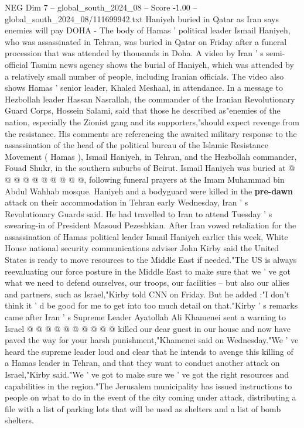\begin{textsample}{NEG Dim 7 – global\_south\_2024\_08 – Score -1.00 – global\_south\_2024\_08/111699942.txt}  \label{ex:f7_neg_279}
Haniyeh buried in Qatar as Iran says enemies will pay DOHA - The body of Hamas ' political leader Ismail Haniyeh, who was assassinated in Tehran, was buried in Qatar on Friday after a funeral procession that was attended by thousands in Doha.
A video by Iran ' s semi-official Tasnim news agency shows the burial of Haniyeh, which was attended by a relatively small number of people, including Iranian officials.
The video also shows Hamas ' senior leader, Khaled Meshaal, in attendance.
In a message to Hezbollah leader Hassan Nasrallah, the commander of the Iranian Revolutionary Guard Corps, Hossein Salami, said that those he described as"enemies of the nation, especially the Zionist gang and its supporters,"should expect revenge from the resistance.
His comments are referencing the awaited military response to the assassination of the head of the political bureau of the Islamic Resistance Movement ( Hamas ), Ismail Haniyeh, in Tehran, and the Hezbollah commander, Fouad Shukr, in the southern suburbs of Beirut.
Ismail Haniyeh was buried at @ @ @ @ @ @ @ @ @ @, following funeral prayers at the Imam Muhammad bin Abdul Wahhab mosque.
Haniyeh and a bodyguard were killed in the \textbf{pre-dawn} attack on their accommodation in Tehran early Wednesday, Iran ' s Revolutionary Guards said.
He had travelled to Iran to attend Tuesday ' s swearing-in of President Masoud Pezeshkian.
After Iran vowed retaliation for the assassination of Hamas political leader Ismail Haniyeh earlier this week, White House national security communications adviser John Kirby said the United States is ready to move resources to the Middle East if needed."The US is always reevaluating our force posture in the Middle East to make sure that we ' ve got what we need to defend ourselves, our troops, our facilities -- but also our allies and partners, such as Israel,"Kirby told CNN on Friday.
But he added :"I don't think it ' d be good for me to get into too much detail on that."Kirby ' s remarks came after Iran ' s Supreme Leader Ayatollah Ali Khamenei sent a warning to Israel @ @ @ @ @ @ @ @ @ @ killed our dear guest in our house and now have paved the way for your harsh punishment,"Khamenei said on Wednesday."We ' ve heard the supreme leader loud and clear that he intends to avenge this killing of a Hamas leader in Tehran, and that they want to conduct another attack on Israel,"Kirby said."We ' ve got to make sure we ' ve got the right resources and capabilities in the region."The Jerusalem municipality has issued instructions to people on what to do in the event of the city coming under attack, distributing a file with a list of parking lots that will be used as shelters and a list of bomb shelters.

\end{textsample}
